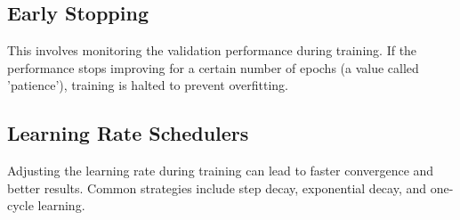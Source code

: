 	\subsection{Early Stopping}
		This involves monitoring the validation performance during training. If the performance stops improving for a certain number of epochs (a value called 'patience'), training is halted to prevent overfitting.
	
	\subsection{Learning Rate Schedulers}
		Adjusting the learning rate during training can lead to faster convergence and better results. Common strategies include step decay, exponential decay, and one-cycle learning.
	
	